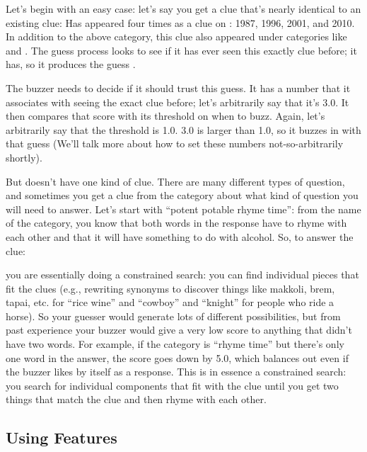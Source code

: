Let's begin with an easy case: let's say you get a clue that's nearly
identical to an existing clue:
Has appeared four times as a clue on \jeopardy{}: 1987, 1996, 2001, and 2010.
%
In addition to the above category, this clue also appeared under categories like  and .
%
The guess process looks to see if it has ever seen this exactly clue before; it has, so it produces the guess .

The buzzer needs to decide if it should trust this guess.
%
It has a number that it associates with seeing the exact clue before; let's
arbitrarily say that it's 3.0.  It then compares that score with its threshold
on when to buzz.  Again, let's arbitrarily say that the threshold is 1.0.  3.0
is larger than 1.0, so it buzzes in with that guess (We'll talk more about how to set these numbers not-so-arbitrarily shortly).

But \jeopardy{} doesn’t have one kind of clue.  There are many different types
of question, and sometimes you get a clue from the category about what kind of
question you will need to answer.  Let’s start with ``potent potable rhyme
time'': from the name of the category, you know that both words in the
response have to rhyme with each other and that it will have something to do
with alcohol.
%
So, to answer the clue:


%
you are essentially doing a constrained search: you can find individual pieces
that fit the clues (e.g., rewriting synonyms to discover things like makkoli,
brem, tapai, etc. for ``rice wine'' and ``cowboy'' and ``knight'' for people
who ride a horse).
%
So your guesser would generate lots of different possibilities, but from past
experience your buzzer would give a very low score to anything that didn't
have two words.
%
For example, if the category is ``rhyme time'' but there's only one word in
the answer, the score goes down by 5.0, which balances out even if the buzzer
likes  by itself as a response.
%
This is in essence a
constrained search: you search for individual components that fit with the
clue until you get two things that match the clue and then rhyme with each
other.

\subsection{Using Features}
\label{sec:watson:features}

